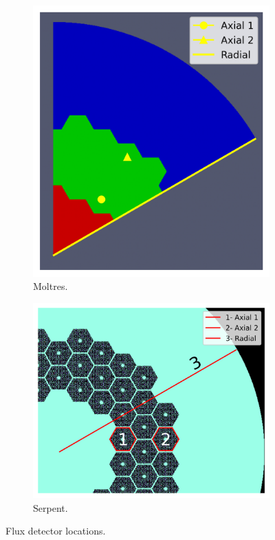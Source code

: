 \documentclass[11pt,letterpaper]{article}
\begin{document}
\begin{figure}[htbp!]
	\centering
	\begin{subfigure}[t]{0.4\textwidth}
		\centering
		\includegraphics[width=\linewidth]{figures-fullcore/3D-fullcore-60-detectors}
		\caption{Moltres.}
	\end{subfigure}
	\begin{subfigure}[t]{0.4\textwidth}
		\centering
		\includegraphics[width=\linewidth]{figures-fullcore/oecd-fullcore-detectorsB}
		\caption{Serpent.}
	\end{subfigure}
	\hfill
	\caption{Flux detector locations.}
	\label{fig:fullcore-detectors}
\end{figure}
\end{document}
